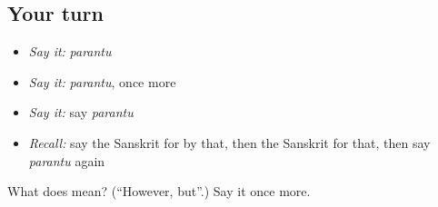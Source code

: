 \subsection*{Your turn}
\begin{itemize}
\raggedright
  \item \emph{Say it:} \emph{parantu}
  \item \emph{Say it:} \emph{parantu}, once more
  \item \emph{Say it:} say \emph{parantu}
  \item \emph{Recall:} say the Sanskrit for by that, then the Sanskrit for that, then say \emph{parantu} again
\end{itemize}

\begin{tcolorbox}[breakable,colback=teal!4,colframe=teal!35!black,title={Before you move on}]
What does  mean? (\textquotedblleft{}However, but\textquotedblright{}.) Say it once more.
\end{tcolorbox}
